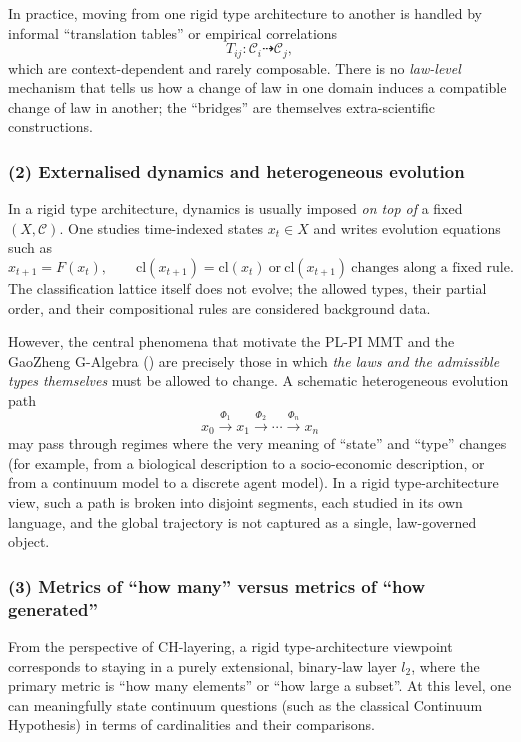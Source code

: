\documentclass[11pt]{book}
\theoremstyle{plain}
\theoremstyle{definition}
\begin{document}
	In practice, moving from one rigid type architecture to another is handled
	by informal “translation tables” or empirical correlations
	\[
	   T_{ij}\colon \mathcal{C}_i \dashrightarrow \mathcal{C}_j,
	\]
	which are context-dependent and rarely composable. There is no
	\emph{law-level} mechanism that tells us how a change of law in one
	domain induces a compatible change of law in another; the “bridges”
	are themselves extra-scientific constructions.
	


\subsubsection*{(2) Externalised dynamics and heterogeneous evolution}

In a rigid type architecture, dynamics is usually imposed
\emph{on top of} a fixed $(X,\mathcal{C})$. One studies
time-indexed states $x_t\in X$ and writes evolution equations such as
\[
   x_{t+1} = F(x_t),\qquad
   \mathrm{cl}(x_{t+1}) = \mathrm{cl}(x_t)\ \text{or}\ 
   \mathrm{cl}(x_{t+1})\ \text{changes along a fixed rule}.
\]
The classification lattice itself does not evolve; the allowed types,
their partial order, and their compositional rules are considered
background data.

	However, the central phenomena that motivate the PL-PI MMT and the
	GaoZheng G-Algebra (\GAlgebra) are precisely those in which
	\emph{the laws and the admissible types themselves} must be allowed to
	change. A schematic heterogeneous evolution path
	\[
	  x_0 \xrightarrow{\Phi_1} x_1 \xrightarrow{\Phi_2} \cdots
	      \xrightarrow{\Phi_n} x_n
\]
	may pass through regimes where the very meaning of “state” and “type”
	changes (for example, from a biological description to a socio-economic
description, or from a continuum model to a discrete agent model). In a
rigid type-architecture view, such a path is broken into disjoint segments,
	each studied in its own language, and the global trajectory is not
	captured as a single, law-governed object.
	


\subsubsection*{(3) Metrics of “how many” versus metrics of “how generated”}

From the perspective of CH-layering, a rigid type-architecture viewpoint corresponds
to staying in a purely extensional, binary-law layer $l_2$, where the
primary metric is “how many elements” or “how large a subset”. At this
level, one can meaningfully state continuum questions (such as the
classical Continuum Hypothesis) in terms of cardinalities and their
comparisons.
\end{document}
